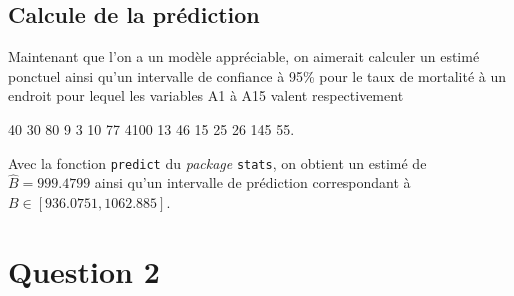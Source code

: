 \documentclass{article}
\begin{document}
	\subsection{Calcule de la prédiction}
	Maintenant que l'on a un modèle appréciable, on aimerait calculer un estimé ponctuel ainsi qu’un intervalle de confiance à 95\% pour le taux de mortalité à un endroit pour lequel les variables A1 à A15 valent respectivement
	\begin{center}
		40 30 80 9 3 10 77 4100 13 46 15 25 26 145 55.
	\end{center}
	Avec la fonction \texttt{predict} du \textit{package} \texttt{stats}, on obtient un estimé de $\hat{B} = 999.4799$ ainsi qu'un intervalle de prédiction correspondant à  $B \in [936.0751, 1062.885]$.
	
\section{Question 2}
 
	\appendix
\end{document}
